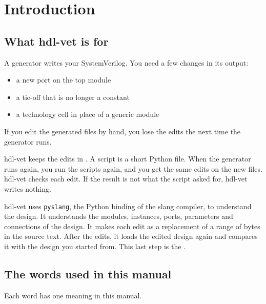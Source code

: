 \chapter{Introduction}
\label{ch:intro}

\section{What hdl-vet is for}

A generator writes your SystemVerilog. You need a few changes in its output:

\begin{itemize}
\item a new port on the top module
\item a tie-off that is no longer a constant
\item a technology cell in place of a generic module
\end{itemize}

If you edit the generated files by hand, you lose the edits the next time the
generator runs.

hdl-vet keeps the edits in . A script is a short Python file. When the
generator runs again, you run the scripts again, and you get the same edits on
the new files. hdl-vet checks each edit. If the result is not what the script
asked for, hdl-vet writes nothing.

hdl-vet uses \texttt{pyslang}, the Python binding of the slang compiler, to
understand the design. It understands the modules, instances, ports, parameters
and connections of the design. It makes each edit as a replacement of a range of
bytes in the source text. After the edits, it loads the edited design again and
compares it with the design you started from. This last step is the .

\section{The words used in this manual}

Each word has one meaning in this manual.


